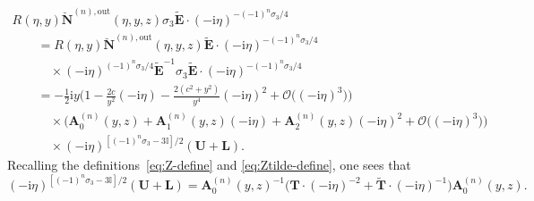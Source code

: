 \documentclass[11pt]{article}
\numberwithin{equation}{section}
\numberwithin{equation}{section}
\begin{document}
\begin{gather*}
R(\eta,y)\breve{\mathbf{N}}^{(n),\mathrm{out}}(\eta,y,z)\sigma_3\widetilde{\mathbf{E}}\cdot(-\mathrm{i}\eta)^{-(-1)^n\sigma_3/4}\\
\qquad {} =
R(\eta,y)\breve{\mathbf{N}}^{(n),\mathrm{out}}(\eta,y,z)\widetilde{\mathbf{E}}\cdot(-\mathrm{i}\eta)^{-(-1)^n\sigma_3/4}\\
 \qquad\quad{}\times
(-\mathrm{i}\eta)^{(-1)^n\sigma_3/4}\widetilde{\mathbf{E}}^{-1}\sigma_3\widetilde{\mathbf{E}}\cdot(-\mathrm{i}\eta)^{-(-1)^n\sigma_3/4}\\
\qquad{} =-\tfrac{1}{2}\mathrm{i} y \Big(1-\tfrac{2c}{y^2}(-\mathrm{i}\eta) -\tfrac{2(c^2+y^2)}{y^4}(-\mathrm{i}\eta)^2+\mathcal{O}\bigl((-\mathrm{i}\eta)^3\bigr)\Big)\\
 \qquad\quad{}\times\bigl(\mathbf{A}_0^{(n)}(y,z) + \mathbf{A}_1^{(n)}(y,z)(-\mathrm{i}\eta) + \mathbf{A}_2^{(n)}(y,z)(-\mathrm{i}\eta)^2 + \mathcal{O}\bigl((-\mathrm{i}\eta)^3\bigr)\bigr)\\
 \qquad\quad{}\times
(-\mathrm{i}\eta)^{[(-1)^n\sigma_3-3\mathbb{I}]/2}(\mathbf{U}+\mathbf{L}).
\end{gather*}
Recalling the definitions~\eqref{eq:Z-define} and \eqref{eq:Ztilde-define},
one sees that \[
(-\mathrm{i}\eta)^{[(-1)^n\sigma_3-3\mathbb{I}]/2}(\mathbf{U}+\mathbf{L})=\mathbf{A}_0^{(n)}(y,z)^{-1}\bigl(\mathbf{T}\cdot(-\mathrm{i}\eta)^{-2} +\widetilde{\mathbf{T}}\cdot(-\mathrm{i}\eta)^{-1}\bigr)\mathbf{A}_0^{(n)}(y,z).
\]
\pagebreak
\end{document}
